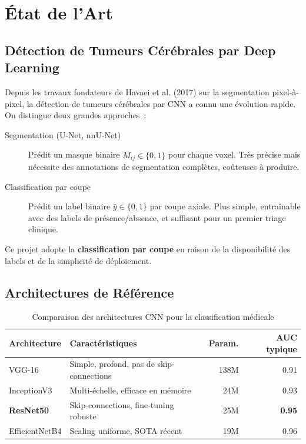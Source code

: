\documentclass[12pt, a4paper]{report}
\begin{document}
\chapter{État de l'Art}
\label{chap:etat_art}

\section{Détection de Tumeurs Cérébrales par Deep Learning}

Depuis les travaux fondateurs de Havaei et al. (2017) sur la
segmentation pixel-à-pixel, la détection de tumeurs cérébrales par
CNN a connu une évolution rapide. On distingue deux grandes approches~:

\begin{description}
  \item[Segmentation (U-Net, nnU-Net)] Prédit un masque binaire
        \(\hat{M}_{ij} \in \{0, 1\}\) pour chaque voxel.
        Très précise mais nécessite des annotations de segmentation
        complètes, coûteuses à produire.

  \item[Classification par coupe] Prédit un label binaire
        \(\hat{y} \in \{0, 1\}\) par coupe axiale.
        Plus simple, entraînable avec des labels de présence/absence,
        et suffisant pour un premier triage clinique.
\end{description}

Ce projet adopte la \textbf{classification par coupe} en raison de la
disponibilité des labels et de la simplicité de déploiement.

\section{Architectures de Référence}

\begin{table}[h]
  \centering
  \caption{Comparaison des architectures CNN pour la classification médicale}
  \label{tab:architectures}
  \begin{tabularx}{\textwidth}{lXrr}
    \toprule
    \textbf{Architecture} & \textbf{Caractéristiques} &
    \textbf{Param.} & \textbf{AUC typique} \\
    \midrule
    VGG-16     & Simple, profond, pas de skip-connections & 138M & 0.91 \\
    InceptionV3 & Multi-échelle, efficace en mémoire & 24M & 0.93 \\
    \textbf{ResNet50} & Skip-connections, fine-tuning robuste & 25M & \textbf{0.95} \\
    EfficientNetB4 & Scaling uniforme, SOTA récent & 19M & 0.96 \\
    \bottomrule
  \end{tabularx}
\end{table}
\end{document}
